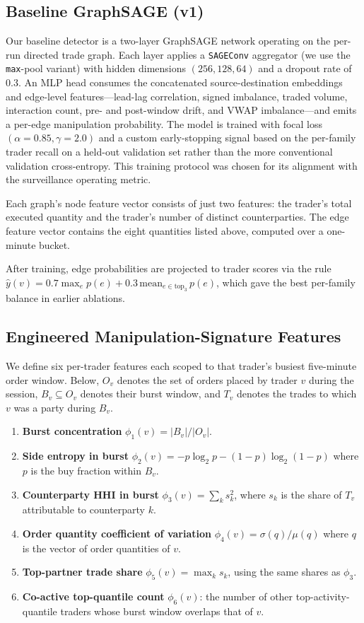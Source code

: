 \documentclass[10pt,twocolumn,letterpaper]{article}
\begin{document}
\subsection{Baseline GraphSAGE (v1)}
\label{sec:v1}
Our baseline detector is a two-layer GraphSAGE network operating on the
per-run directed trade graph. Each layer applies a
\texttt{SAGEConv} aggregator (we use the \texttt{max}-pool variant) with
hidden dimensions \((256,128,64)\) and a dropout rate of \(0.3\). An
MLP head consumes the concatenated source-destination embeddings and
edge-level features---lead-lag correlation, signed imbalance, traded
volume, interaction count, pre- and post-window drift, and VWAP
imbalance---and emits a per-edge manipulation probability. The model is
trained with focal loss
\((\alpha{=}0.85,\gamma{=}2.0)\) and a custom early-stopping signal
based on the per-family trader recall on a held-out validation set
rather than the more conventional validation cross-entropy. This
training protocol was chosen for its alignment with the surveillance
operating metric.

Each graph's node feature vector consists of just two features:
the trader's total executed quantity and the trader's number of
distinct counterparties. The edge feature vector contains the eight
quantities listed above, computed over a one-minute bucket.

After training, edge probabilities are projected to trader scores via
the rule
\(\hat{y}(v) = 0.7\max_e p(e) + 0.3\,\mathrm{mean}_{e\in\mathrm{top}_3}\, p(e)\),
which gave the best per-family balance in earlier ablations.

\subsection{Engineered Manipulation-Signature Features}
\label{sec:features}
We define six per-trader features each scoped to that trader's
busiest five-minute order window. Below, \(O_v\) denotes the set of
orders placed by trader \(v\) during the session, \(B_v\subseteq O_v\)
denotes their burst window, and \(T_v\) denotes the trades to which
\(v\) was a party during \(B_v\).

\begin{enumerate}
\item \textbf{Burst concentration}
\(\phi_1(v) = |B_v|/|O_v|\).
\item \textbf{Side entropy in burst}
\(\phi_2(v) = -p\log_2 p - (1-p)\log_2(1-p)\)
where \(p\) is the buy fraction within \(B_v\).
\item \textbf{Counterparty HHI in burst}
\(\phi_3(v) = \sum_k s_k^2\),
where \(s_k\) is the share of \(T_v\) attributable to counterparty \(k\).
\item \textbf{Order quantity coefficient of variation}
\(\phi_4(v) = \sigma(q)/\mu(q)\)
where \(q\) is the vector of order quantities of \(v\).
\item \textbf{Top-partner trade share}
\(\phi_5(v) = \max_k s_k\), using the same shares as \(\phi_3\).
\item \textbf{Co-active top-quantile count}
\(\phi_6(v)\): the number of other top-activity-quantile traders whose
burst window overlaps that of \(v\).
\end{enumerate}
\end{document}
